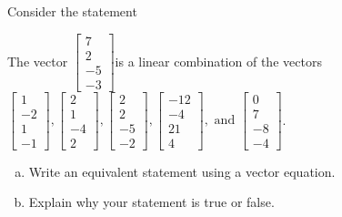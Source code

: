 
\begin{exerciseStatement}


Consider the statement 
\begin{center}\begin{minipage}{0.8\textwidth}
 The vector \( \left[\begin{array}{c}
7 \\
2 \\
-5 \\
-3
\end{array}\right] \)is a linear combination of the vectors \( \left[\begin{array}{c}
1 \\
-2 \\
1 \\
-1
\end{array}\right] , \left[\begin{array}{c}
2 \\
1 \\
-4 \\
2
\end{array}\right] , \left[\begin{array}{c}
2 \\
2 \\
-5 \\
-2
\end{array}\right] , \left[\begin{array}{c}
-12 \\
-4 \\
21 \\
4
\end{array}\right] , \text{ and } \left[\begin{array}{c}
0 \\
7 \\
-8 \\
-4
\end{array}\right] \). 
\end{minipage}\end{center}
    


\begin{enumerate}[(a)]
\item  Write an equivalent statement using a vector equation.
\item  Explain why your statement is true or false.
\end{enumerate}
    
\end{exerciseStatement}
    
